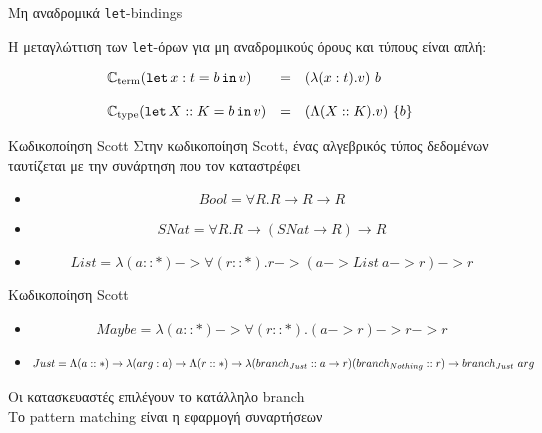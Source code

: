 \documentclass[10pt]{beamer}
\begin{document}
\begin{frame}[fragile]{Μη αναδρομικά \texttt{let}-bindings }

Η μεταγλώττιση των \texttt{let}-όρων για μη αναδρομικούς όρους και τύπους
είναι απλή:

\begin{displaymath}
    \begin{array}{lll}
    \mathbb{C}_{\mathrm{term}}(\operatorname{\texttt{let}} x : t = b \operatorname{\texttt{in}} v) &=& (\lambda (x : t) . v)\ b\\
    \\
    \mathbb{C}_{\mathrm{type}}(\operatorname{\texttt{let}} X :: K = b \operatorname{\texttt{in}} v) &=& (\Lambda (X :: K) . v)\ \{b\}
    \end{array}
\end{displaymath}

\end{frame}

\begin{frame}{Κωδικοποίηση Scott}
Στην κωδικοποίηση Scott, ένας αλγεβρικός τύπος δεδομένων ταυτίζεται με την
συνάρτηση που τον καταστρέφει

\begin{itemize}
    \item[]
\begin{displaymath}
 Bool = \forall R . R \rightarrow R \rightarrow R
\end{displaymath}
\item[]
\begin{displaymath}
 SNat =  \forall R . R \rightarrow (SNat \rightarrow R) \rightarrow R
\end{displaymath}

\item[]
\begin{displaymath}
 List = \lambda (a :: *) ->
  \forall (r :: *) . r -> (a -> List ~ a -> r) -> r
\end{displaymath}

\end{itemize}

\end{frame}

\begin{frame}{Κωδικοποίηση Scott}
\begin{itemize}
\item[]
    \begin{displaymath}
    Maybe = \lambda(a :: *) ->
  \forall (r :: *) . (a -> r) -> r -> r
    \end{displaymath}

\item[]
\begin{displaymath}
Just = \Lambda(a :: *) -> \lambda(arg : a) ->
  \Lambda(r :: *) ->  \\
    \lambda (branch_{Just} :: a -> r)
     (branch_{Nothing} :: r) ->
        branch_{Just} ~arg
\end{displaymath}

\end{itemize}

Οι κατασκευαστές επιλέγουν το κατάλληλο branch \\
\alert{Το pattern matching είναι η εφαρμογή συναρτήσεων}

\end{frame}
\end{document}
